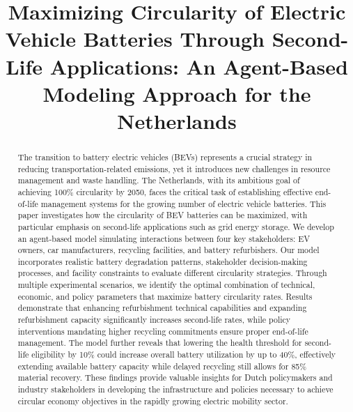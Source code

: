 \documentclass[conference]{IEEEtran}
\begin{document}
\title{Maximizing Circularity of Electric Vehicle Batteries Through Second-Life Applications: An Agent-Based Modeling Approach for the Netherlands}

\author{
}

\maketitle

\begin{abstract}
The transition to battery electric vehicles (BEVs) represents a crucial strategy in reducing transportation-related emissions, yet it introduces new challenges in resource management and waste handling. The Netherlands, with its ambitious goal of achieving 100\% circularity by 2050, faces the critical task of establishing effective end-of-life management systems for the growing number of electric vehicle batteries. This paper investigates how the circularity of BEV batteries can be maximized, with particular emphasis on second-life applications such as grid energy storage. We develop an agent-based model simulating interactions between four key stakeholders: EV owners, car manufacturers, recycling facilities, and battery refurbishers. Our model incorporates realistic battery degradation patterns, stakeholder decision-making processes, and facility constraints to evaluate different circularity strategies. Through multiple experimental scenarios, we identify the optimal combination of technical, economic, and policy parameters that maximize battery circularity rates. Results demonstrate that enhancing refurbishment technical capabilities and expanding refurbishment capacity significantly increases second-life rates, while policy interventions mandating higher recycling commitments ensure proper end-of-life management. The model further reveals that lowering the health threshold for second-life eligibility by 10\% could increase overall battery utilization by up to 40\%, effectively extending available battery capacity while delayed recycling still allows for 85\% material recovery. These findings provide valuable insights for Dutch policymakers and industry stakeholders in developing the infrastructure and policies necessary to achieve circular economy objectives in the rapidly growing electric mobility sector.
\end{abstract}
\end{document}
